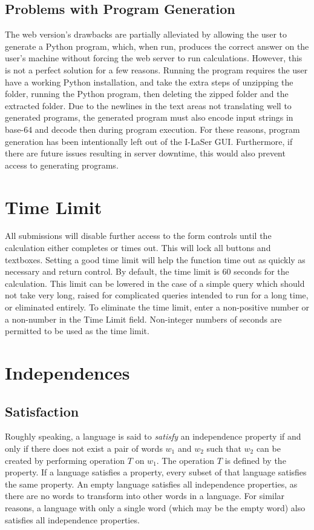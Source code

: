 \documentclass{article}
\begin{document}
\subsection{Problems with Program Generation}
\par The web version's drawbacks are partially alleviated by allowing the user to generate a Python program, which, when run, produces the correct answer on the user's machine without forcing the web server to run calculations. However, this is not a perfect solution for a few reasons. Running the program requires the user have a working Python installation, and take the extra steps of unzipping the folder, running the Python program, then deleting the zipped folder and the extracted folder. Due to the newlines in the text areas not translating well to generated programs, the generated program must also encode input strings in base-64 and decode then during program execution. For these reasons, program generation has been intentionally left out of the I-LaSer GUI. Furthermore, if there are future issues resulting in server downtime, this would also prevent access to generating programs.

\section{Time Limit}
All submissions will disable further access to the form controls until the calculation either completes or times out. This will lock all buttons and textboxes.
Setting a good time limit will help the function time out as quickly as necessary and return control.
By default, the time limit is 60 seconds for the calculation. This limit can be lowered in the case of a simple query which should not take very long, raised for complicated queries intended to run for a long time, or eliminated entirely.
To eliminate the time limit, enter a non-positive number or a non-number in the Time Limit field.
Non-integer numbers of seconds are permitted to be used as the time limit.

\section{Independences}

\subsection{Satisfaction}
\par Roughly speaking, a language is said to \textit{satisfy} an independence property if and only if there does not exist a pair of words $w_1$ and $w_2$ such that $w_2$ can be created by performing operation $T$ on $w_1$. The operation $T$ is defined by the property. If a language satisfies a property, every subset of that language satisfies the same property. An empty language satisfies all independence properties, as there are no words to transform into other words in a language. For similar reasons, a language with only a single word (which may be the empty word) also satisfies all independence properties. %
\end{document}

